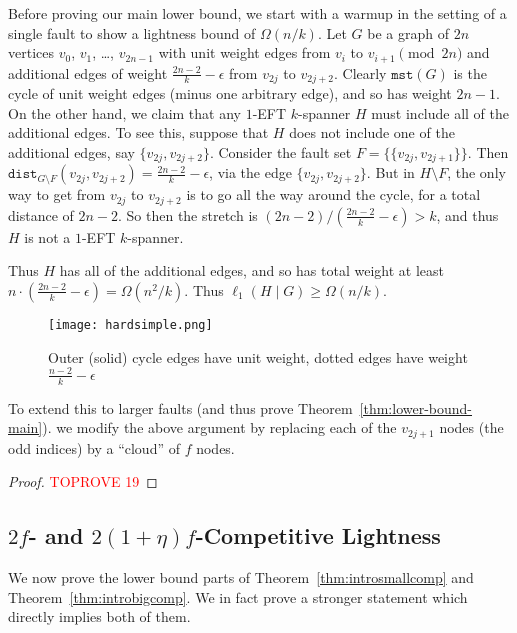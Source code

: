 \documentclass{article}
\theoremstyle{plain}
\theoremstyle{definition}
\newcommand{\dist}{\texttt{dist}}
\newcommand{\mst}{\texttt{mst}}
\begin{document}
Before proving our main lower bound, we start with a warmup in the setting of a single fault to show a lightness bound of $\Omega(n/k)$. Let $G$ be a graph of $2n$ vertices $v_0$, $v_1$, \ldots, $v_{2n-1}$ with unit weight edges from $v_i$ to $v_{i+1} \pmod{2n}$  and additional edges of weight $\frac{2n-2}{k} - \epsilon$ from $v_{2j}$ to $v_{2j+2}$. Clearly $\mst(G)$ is the cycle of unit weight edges (minus one arbitrary edge), and so has weight $2n-1$.  On the other hand, we claim that any $1$-EFT $k$-spanner $H$ must include all of the additional edges.  To see this, suppose that $H$ does not include one of the additional edges, say $\{v_{2j}, v_{2j+2}\}$.  Consider the fault set $F = \{\{v_{2j}, v_{2j+1}\}\}$.  Then $\dist_{G \setminus F}(v_{2j}, v_{2j+2}) = \frac{2n-2}{k} - \epsilon$, via the edge $\{v_{2j}, v_{2j+2}\}$.  But in $H \setminus F$, the only way to get from $v_{2j}$ to $v_{2j+2}$ is to go all the way around the cycle, for a total distance of $2n-2$.  So then the stretch is $(2n-2) / \left(\frac{2n-2}{k} - \epsilon\right) > k$, and thus $H$ is not a $1$-EFT $k$-spanner.  

Thus $H$ has all of the additional edges, and so has total weight at least $n \cdot \left(\frac{2n-2}{k} - \epsilon\right) = \Omega(n^2 / k)$.  Thus $\ell_1(H \mid G) \geq \Omega(n/k)$.

\begin{figure}[h]
    \centering
    \texttt{[image: hardsimple.png]}
    \caption{Outer (solid) cycle edges have unit weight, dotted edges have weight $\frac{n-2}{k} - \epsilon$}
    \label{fig:enter-label}
\end{figure}

To extend this to larger faults (and thus prove Theorem~\ref{thm:lower-bound-main}). we modify the above argument by replacing each of the $v_{2j+1}$ nodes (the odd indices) by a ``cloud'' of $f$ nodes.

\begin{proof}\textcolor{red}{TOPROVE 19}\end{proof}

\subsection{$2f$- and $2(1+\eta)f$-Competitive Lightness} \label{sec:lowerbigcompetitive}
We now prove the lower bound parts of Theorem~\ref{thm:introsmallcomp} and Theorem~\ref{thm:introbigcomp}.  We in fact prove a stronger statement which directly implies both of them.
\end{document}
